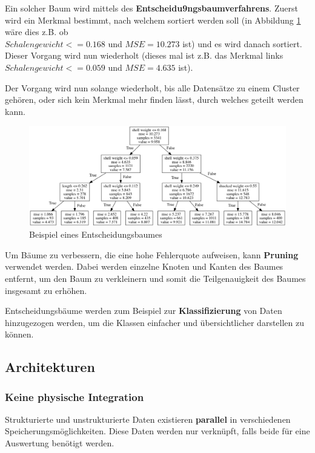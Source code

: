 \documentclass[a4paper, 11pt, nofootinbib]{article}
\begin{document}
\vspace{10px}

\noindent Ein solcher Baum wird mittels des \textbf{Entscheidu9ngsbaumverfahrens}. Zuerst wird ein Merkmal bestimmt, nach welchem sortiert werden soll (in Abbildung \ref{fig:tree} wäre dies z.B. ob \\ 
$Schalengewicht <= 0.168$ und  $MSE = 10.273$ ist) und es wird danach sortiert. Dieser Vorgang wird nun wiederholt (dieses mal ist z.B. das Merkmal links $Schalengewicht <=0.059$ und $MSE = 4.635$ ist).

Der Vorgang wird nun solange wiederholt, bis alle Datensätze zu einem Cluster gehören, oder sich kein Merkmal mehr finden lässt, durch welches geteilt werden kann.

\begin{figure}[htb]
	\centering
	\includegraphics[keepaspectratio=true,height=13\baselineskip]{tree.png}
	\caption{Beispiel eines Entscheidungsbaumes}
	\label{fig:tree}
\end{figure}

Um Bäume zu verbessern, die eine hohe Fehlerquote aufweisen, kann \textbf{Pruning} verwendet werden. Dabei werden einzelne Knoten und Kanten des Baumes entfernt, um den Baum zu verkleinern und somit die Teilgenauigkeit des Baumes insgesamt zu erhöhen.

\vspace{10px}

\noindent Entscheidungsbäume werden zum Beispiel zur \textbf{Klassifizierung} von Daten hinzugezogen werden, um die Klassen einfacher und übersichtlicher darstellen zu können.

\newpage

\subsection{Architekturen}
\subsubsection{Keine physische Integration}
Strukturierte und unstrukturierte Daten existieren \textbf{parallel} in verschiedenen Speicherungsmöglichkeiten. Diese Daten werden nur verknüpft, falls beide für eine Auswertung benötigt werden.
\end{document}
